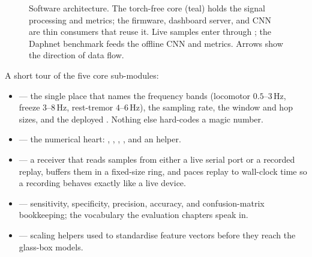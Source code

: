 \begin{figure}[H]
{}
\caption{Software architecture. The torch-free  core (teal) holds the signal
processing and metrics; the firmware, dashboard server, and CNN are thin consumers that
reuse it. Live samples enter through ; the Daphnet benchmark feeds the
offline CNN and metrics. Arrows show the direction of data flow.}
\label{fig:sw-modules}
\end{figure}

A short tour of the five core sub-modules:

\begin{itemize}
\item \textbf{} --- the single place that names the frequency bands
  (locomotor $0.5$--$3$\,Hz, freeze $3$--$8$\,Hz, rest-tremor $4$--$6$\,Hz), the
  sampling rate, the window and hop sizes, and the deployed .
  Nothing else hard-codes a magic number.
\item \textbf{} --- the numerical heart: , ,
  , , and an  helper.
\item \textbf{} --- a receiver that reads samples from either a live
  serial port or a recorded replay, buffers them in a fixed-size ring, and paces
  replay to wall-clock time so a recording behaves exactly like a live device.
\item \textbf{} --- sensitivity, specificity, precision, accuracy, and
  confusion-matrix bookkeeping; the vocabulary the evaluation chapters speak in.
\item \textbf{} --- scaling helpers used to standardise feature vectors
  before they reach the glass-box models.
\end{itemize}

